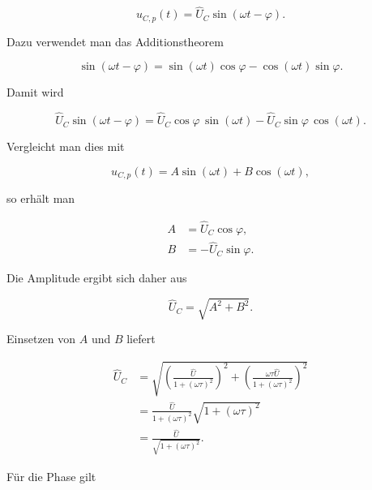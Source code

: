 \begin{equation}
	u_{C,p}(t)
	=
	\hat{U}_C\sin(\omega t-\varphi).
	\label{eq:rc-partikulaere-loesung-amplitude-phase-ansatz}
\end{equation}

Dazu verwendet man das Additionstheorem

\begin{equation}
	\sin(\omega t-\varphi)
	=
	\sin(\omega t)\cos\varphi
	-
	\cos(\omega t)\sin\varphi.
	\label{eq:rc-additionstheorem-sinus}
\end{equation}

Damit wird

\begin{equation}
	\hat{U}_C\sin(\omega t-\varphi)
	=
	\hat{U}_C\cos\varphi \, \sin(\omega t)
	-
	\hat{U}_C\sin\varphi \, \cos(\omega t).
	\label{eq:rc-amplitude-phase-ausmultipliziert}
\end{equation}

Vergleicht man dies mit

\begin{equation}
	u_{C,p}(t)=A\sin(\omega t)+B\cos(\omega t),
	\label{eq:rc-vergleich-sinus-cosinus-form}
\end{equation}

so erhält man

\begin{align}
	A &= \hat{U}_C\cos\varphi,
	\label{eq:rc-a-amplitude-phase} \\[4pt]
	B &= -\hat{U}_C\sin\varphi.
	\label{eq:rc-b-amplitude-phase}
\end{align}

Die Amplitude ergibt sich daher aus

\begin{equation}
	\hat{U}_C
	=
	\sqrt{A^2+B^2}.
	\label{eq:rc-amplitude-aus-a-b}
\end{equation}

Einsetzen von \(A\) und \(B\) liefert

\begin{align}
	\hat{U}_C
	&=
	\sqrt{
		\left(
		\frac{\hat{U}}{1+(\omega\tau)^2}
		\right)^2
		+
		\left(
		\frac{\omega\tau\hat{U}}{1+(\omega\tau)^2}
		\right)^2
	}
	\\[6pt]
	&=
	\frac{\hat{U}}{1+(\omega\tau)^2}
	\sqrt{1+(\omega\tau)^2}
	\\[6pt]
	&=
	\frac{\hat{U}}{\sqrt{1+(\omega\tau)^2}}.
	\label{eq:rc-stationaere-amplitude-herleitung}
\end{align}

Für die Phase gilt

